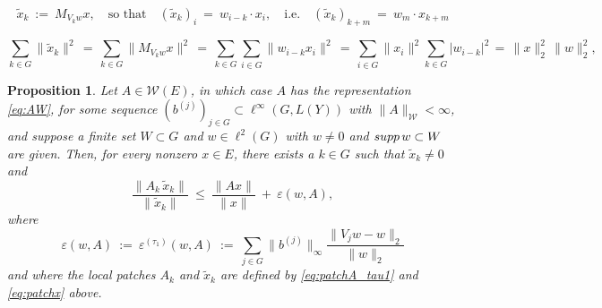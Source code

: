 \documentclass[10pt,a4paper]{amsart}
\newtheorem{proposition}{Proposition}
\newcommand\W{{\mathcal W}}
\newcommand\eps{{\varepsilon}}
\newcommand\supp{{\rm supp\,}}
\begin{document}
\begin{equation} \label{eq:patchx}
\tilde x_k\ :=\ M_{V_kw}x,\quad\text{so that}\quad (\tilde x_k)_i\ =\ w_{i-k}\cdot x_i,\quad\text{i.e.}\quad (\tilde x_k)_{k+m}\ =\ w_m\cdot x_{k+m}
\end{equation}

\begin{equation}\label{eq:lem-trick1}
\sum_{k\in G} \|\tilde x_k\|^2\, =\, \sum_{k\in G}\|M_{V_kw}x\|^2\, =\, \sum_{k\in G}\sum_{i\in G}\|w_{i-k}x_i\|^2\, =\, \sum_{i\in G}\|x_i\|^2\sum_{k\in G}|w_{i-k}|^2\, =\, \|x\|_2^2\,\|w\|_2^2,
\end{equation}

\begin{proposition} \label{prop:tau1}
Let $A\in \W(E)$, in which case $A$ has the representation \eqref{eq:AW},
for some sequence $(b^{(j)})_{j\in G} \subset \ell^\infty(G,L(Y))$ with $\|A\|_\W <\infty$, and 
suppose a finite set $W\subset G$ and  %
 $w\in \ell^2(G)$ with $w\neq 0$ and $\supp w\subset W$ 
 are given. Then, for every nonzero $x\in E$, there exists a $k\in G$ such that $\tilde x_k\ne 0$ and
\begin{equation} \label{eq:patchAx_tau1}
\frac{\|A_{k}\, \tilde x_{k}\|}{\| \tilde x_{k}\|}\ \le\ \frac{\|Ax\|}{\|x\|}\ +\ \eps(w,A),
\end{equation}
where
\begin{equation} \label{eq:pen_tau1}
\eps(w,A)\ :=\ \eps^{(\tau_1)}(w,A)\ :=\ \sum_{j\in G} \|b^{(j)}\|_\infty \frac{\|V_jw-w\|_2}{\|w\|_2}
\end{equation}
and where the local patches $A_k$ and $\tilde x_k$ are defined by \eqref{eq:patchA_tau1} and \eqref{eq:patchx} above.
\end{proposition}
\end{document}
